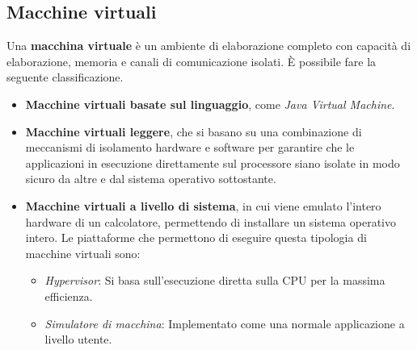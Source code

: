 \subsection{Macchine virtuali}
Una \textbf{macchina virtuale} è un ambiente di elaborazione completo con capacità di elaborazione, memoria e canali di comunicazione isolati. \MakeUppercase{è} possibile fare la seguente classificazione.
\begin{itemize}
    \item \textbf{Macchine virtuali basate sul linguaggio}, come \textit{Java Virtual Machine}.
    \item \textbf{Macchine virtuali leggere}, che si basano su una combinazione di meccanismi di
    isolamento hardware e software per garantire che le applicazioni in esecuzione direttamente sul processore siano isolate in modo sicuro da altre e dal sistema operativo sottostante.
    \item \textbf{Macchine virtuali a livello di sistema}, in cui viene emulato l'intero hardware di un calcolatore, permettendo di installare un sistema operativo intero. Le piattaforme che permettono di eseguire questa tipologia di macchine virtuali sono:
    \begin{itemize}
        \item \textit{Hypervisor}: Si basa sull'esecuzione diretta sulla CPU per la massima efficienza.
        \item \textit{Simulatore di macchina}: Implementato come una normale applicazione a livello utente.
    \end{itemize}
\end{itemize}

